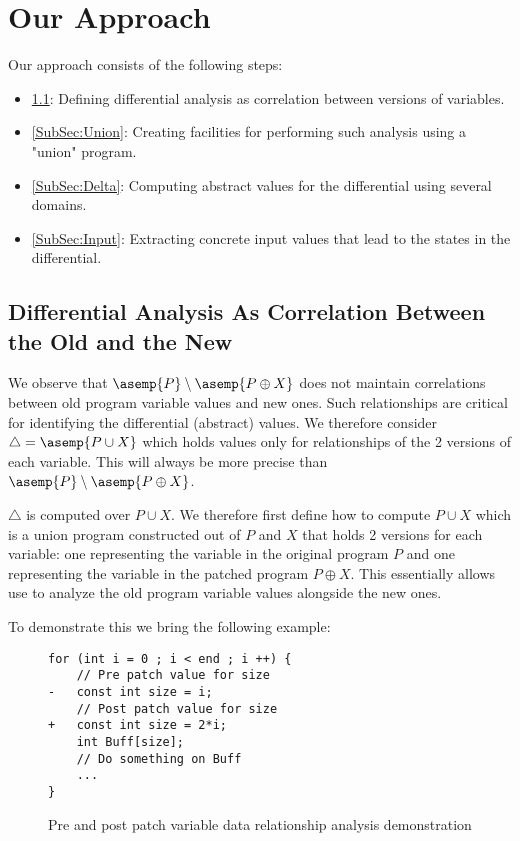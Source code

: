 \section{Our Approach} \label{Sec:OurApproach}

Our approach consists of the following steps:
\begin{itemize}
\item \ref{SubSec:Correlation}: Defining differential analysis as correlation between versions of variables.
\item \ref{SubSec:Union}: Creating facilities for performing such analysis using a "union" program.
\item \ref{SubSec:Delta}: Computing abstract values for the differential using several domains.
\item \ref{SubSec:Input}: Extracting concrete input values that lead to the states in the differential.
\end{itemize}

\subsection{Differential Analysis As Correlation Between the Old and the New}\label{SubSec:Correlation}
We observe that $\asemp{P}\setminus \asemp{P\oplus X}$ does not maintain correlations between old program variable values and new ones. Such relationships are critical for identifying the differential (abstract) values. We therefore consider $\triangle = \asemp{P \cup X}$ which holds values only for relationships of the 2 versions of each variable. This will always be more precise than $\asemp{P}\setminus \asemp{P\oplus X}$.

$\triangle$ is computed over $P \cup X$. We therefore first define how to compute $P \cup X$ which is a union program constructed out of $P$ and $X$ that holds 2 versions for each variable: one representing the variable in the original program $P$ and one representing the variable in the patched program $P \oplus X$. This essentially allows use to analyze the old program variable values alongside the new ones.

To demonstrate this we bring the following example:
\begin{figure}[H]
\begin{lstlisting}
for (int i = 0 ; i < end ; i ++) {
    // Pre patch value for size
-   const int size = i;
    // Post patch value for size
+   const int size = 2*i;
    int Buff[size];
    // Do something on Buff
    ...
}
\end{lstlisting} \caption{Pre and post patch variable data relationship analysis demonstration}
\end{figure}

